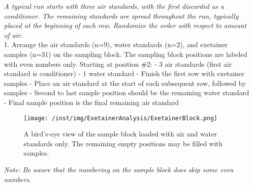 \documentclass[]{article}
\begin{document}
\emph{A typical run starts with three air standards, with the first
discarded as a conditioner. The remaining standards are spread
throughout the run, typically placed at the beginning of each row.
Randomize the order with respect to amount of air.}\\
1. Arrange the air standards (n=9), water standards (n=2), and exetainer
samples (n=31) on the sampling block. The sampling block positions are
labeled with even numbers only. Starting at position \#2: - 3 air
standards (first air standard is conditioner) - 1 water standard -
Finish the first row with exetainer samples - Place an air standard at
the start of each subsequent row, followed by samples - Second to last
sample position should be the remaining water standard - Final sample
position is the final remaining air standard

\begin{figure}
\centering
\texttt{[image: /inst/img/ExetainerAnalysis/ExetainerBlock.png]}
\caption{A bird's-eye view of the sample block loaded with air and water
standards only. The remaining empty positions may be filled with
samples.}
\end{figure}

\emph{Note: Be aware that the numbering on the sample block does skip
some even numbers.}
\end{document}
